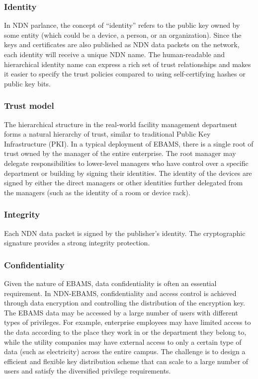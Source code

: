\subsubsection{Identity}

In NDN parlance, the concept of ``identity'' refers to the public key owned by some entity (which could be a device, a person, or an organization).
Since the keys and certificates are also published as NDN data packets on the network, each identity will receive a unique NDN name.
The human-readable and hierarchical identity name can express a rich set of trust relationships and makes it easier to specify the trust policies compared to using self-certifying hashes or public key bits.

\subsubsection{Trust model}

The hierarchical structure in the real-world facility management department forms a natural hierarchy of trust, similar to traditional Public Key Infrastructure (PKI).
In a typical deployment of EBAMS, there is a single root of trust owned by the manager of the entire enterprise.
The root manager may delegate responsibilities to lower-level managers who have control over a specific department or building by signing their identities.
The identity of the devices are signed by either the direct managers or other identities further delegated from the managers (such as the identity of a room or device rack).


\subsubsection{Integrity}

Each NDN data packet is signed by the publisher's identity.
The cryptographic signature provides a strong integrity protection.

\subsubsection{Confidentiality}

Given the nature of EBAMS, data confidentiality is often an essential requirement.
In NDN-EBAMS, confidentiality and access control is achieved through data encryption and controlling the distribution of the encryption key.
The EBAMS data may be accessed by a large number of users with different types of privileges.
For example, enterprise employees may have limited access to the data according to the place they work in or the department they belong to, while the utility companies may have external access to only a certain type of data (such as electricity) across the entire campus.
The challenge is to design a efficient and flexible key distribution scheme that can scale to a large number of users and satisfy the diversified privilege requirements.

